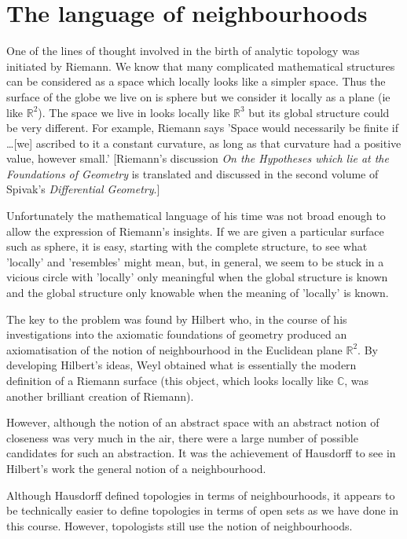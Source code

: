 \section{The language of neighbourhoods}
One of the lines of thought involved in the birth
of analytic topology was initiated by Riemann.
We know that many complicated mathematical structures
can be considered as a space which locally looks like a simpler
space. Thus the surface of the globe we live on is sphere
but we consider it locally as a plane (ie like ${\mathbb R}^{2}$).
The space we live in looks locally like ${\mathbb R}^{3}$
but its global structure could be very different.
For example, Riemann says 'Space would necessarily be
finite if \dots [we] ascribed to it a constant curvature,
as long as that curvature had a positive value, however small.'
[Riemann's discussion
\emph{On the Hypotheses which lie at the Foundations of Geometry}
is translated and discussed in the second volume of Spivak's
\emph{Differential Geometry}.]

Unfortunately the mathematical language of his time
was not broad enough to allow the expression of
Riemann's insights. If we are given a particular
surface such as sphere, it is easy, starting with
the complete structure, to see what 'locally'
and 'resembles' might mean, but, in general, we seem to be stuck
in a vicious circle with 'locally' only meaningful
when the global structure is known and the global structure
only knowable when the meaning of 'locally' is known.

The key to the problem was found by Hilbert who,
in the course of his investigations into the axiomatic
foundations of geometry produced an axiomatisation of
the notion of neighbourhood in the Euclidean plane
${\mathbb R}^{2}$. By developing Hilbert's ideas,
Weyl obtained what is essentially the modern definition
of a Riemann surface (this object, which looks locally like
${\mathbb C}$, was another brilliant creation of Riemann).

However, although the notion of an abstract space with
an abstract notion of closeness was very much in the air,
there were a large number of possible candidates
for such an abstraction. It was the achievement
of Hausdorff to see in Hilbert's work the general notion
of a neighbourhood.

Although Hausdorff defined topologies in terms of neighbourhoods,
it appears to be technically easier to define
topologies in terms of open sets as we have done in this course.
However, topologists still use the notion of neighbourhoods.

